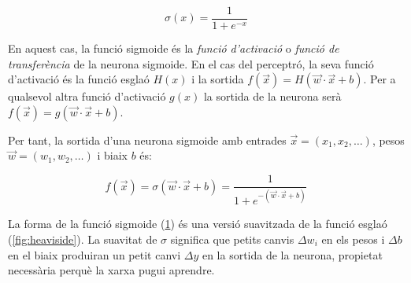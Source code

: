 \begin{refsection}
	\begin{equation}
		\label{eq:sigmoid}
		\sigma(x)=\frac{1}{1+e^{-x}}
	\end{equation}
	
	\begin{figure}[H]
		\centering
	\label{fig:sigmoid}
	\end{figure}

	En aquest cas, la funció sigmoide és la \textit{funció d'activació} o \textit{funció de transferència} de la neurona sigmoide. En el cas del perceptró, la seva funció d'activació és la funció esglaó $H(x)$ i la sortida $f(\vec{x})=H(\vec{w}\cdot\vec{x}+b)$. Per a qualsevol altra funció d'activació $g(x)$ la sortida de la neurona serà $f(\vec{x})=g(\vec{w}\cdot\vec{x}+b)$.

	Per tant, la sortida d'una neurona sigmoide amb entrades $\vec{x}=(x_1,x_2,\ldots)$, pesos $\vec{w}=(w_1,w_2,\ldots)$ i biaix $b$ és:
	
	\begin{equation}
		\label{eq:out}
		f(\vec{x})=\sigma(\vec{w}\cdot\vec{x}+b)=\frac{1}{1+e^{-(\vec{w}\cdot\vec{x}+b)}}
	\end{equation}

	La forma de la funció sigmoide (\cref{fig:sigmoid}) és una versió suavitzada de la funció esglaó (\cref{fig:heaviside}). La suavitat de $\sigma$ significa que petits canvis $\Delta w_i$ en els pesos i $\Delta b$ en el biaix produiran un petit canvi $\Delta y$ en la sortida de la neurona, propietat necessària perquè la xarxa pugui aprendre.
	

	\printbibliography[heading=subbibintoc]

\end{refsection}
